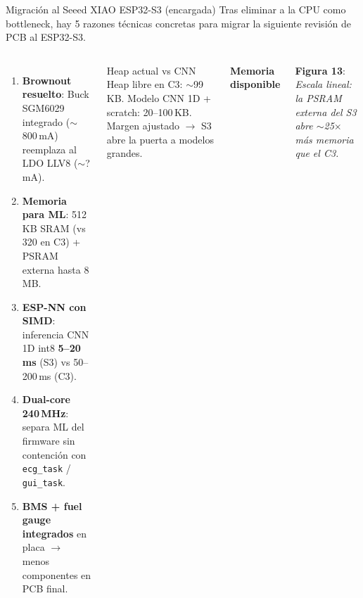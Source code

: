 \documentclass[aspectratio=169, 10pt]{beamer}
\begin{document}
\begin{frame}{Migraci\'on al Seeed XIAO ESP32-S3 (encargada)}
    \scriptsize
    Tras eliminar a la CPU como bottleneck, hay 5 razones t\'ecnicas concretas para migrar la siguiente revisi\'on de PCB al ESP32-S3.
    \vspace{0.15cm}
    \begin{columns}[T]
        \scriptsize
        \begin{enumerate}\itemsep0.05cm
            \item \alert{\textbf{Brownout resuelto}}: Buck SGM6029 integrado ($\sim$800\,mA) reemplaza al LDO LLV8 ($\sim$?\,mA).
            \item \textbf{Memoria para ML}: 512\,KB SRAM (vs 320 en C3) + PSRAM externa hasta 8\,MB.
            \item \textbf{ESP-NN con SIMD}: inferencia CNN 1D int8 \textbf{5--20\,ms} (S3) vs 50--200\,ms (C3).
            \item \textbf{Dual-core 240\,MHz}: separa ML del firmware sin contenci\'on con \texttt{ecg\_task} / \texttt{gui\_task}.
            \item \textbf{BMS + fuel gauge integrados} en placa $\to$ menos componentes en PCB final.
        \end{enumerate}
        \vspace{0.15cm}
        \begin{block}{Heap actual vs CNN}
            \scriptsize Heap libre en C3: $\sim$99\,KB. Modelo CNN 1D + scratch: 20--100\,KB. Margen ajustado $\to$ S3 abre la puerta a modelos grandes.
        \end{block}
        \scriptsize
        \textbf{Memoria disponible}
        \vspace{0.05cm}

        \vspace{0.1cm}\newline
        \scriptsize\textbf{Figura 13}: \textit{Escala lineal: la PSRAM externa del S3 abre $\sim$25$\times$ m\'as memoria que el C3.}
    \end{columns}
\end{frame}
\end{document}
